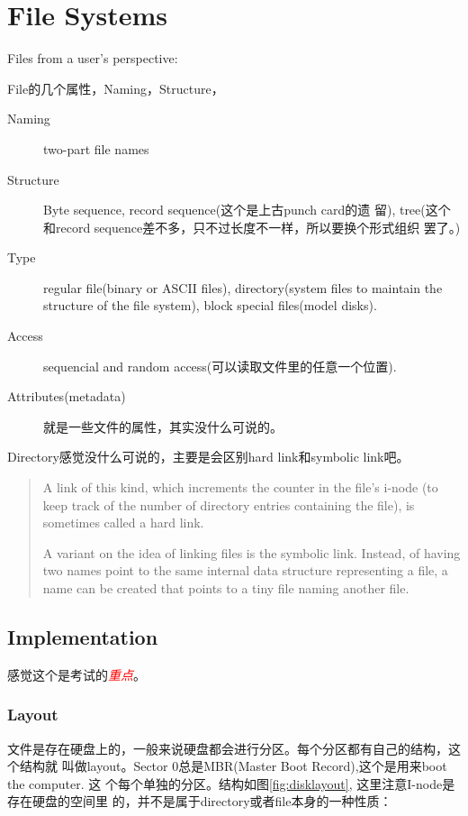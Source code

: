 \documentclass[a4paper]{article}
\newcommand{\emphasis}[1]{\textcolor{red}{\textit{#1}}}
\begin{document}
\section{File Systems}
Files from a user's perspective:

File的几个属性，Naming，Structure，
\begin{description}
\item[Naming]{two-part file names} 
\item[Structure]{Byte sequence, record sequence(这个是上古punch card的遗
    留), tree(这个和record sequence差不多，只不过长度不一样，所以要换个形式组织
    罢了。)} 
\item[Type]{regular file(binary or ASCII files), directory(system files to
    maintain the structure of the file system), block special files(model disks).} 
\item[Access]{sequencial and random access(可以读取文件里的任意一个位置).} 
\item[Attributes(metadata)]{就是一些文件的属性，其实没什么可说的。} 
\end{description}

Directory感觉没什么可说的，主要是会区别hard link和symbolic link吧。

\begin{quote}
  A link of this kind, which increments the counter in the file’s
i-node (to keep track of the number of directory entries containing the
file), is sometimes called a hard link.

  A variant on the idea of linking files is the symbolic link. Instead, of having
two names point to the same internal data structure representing a file, a name can
be created that points to a tiny file naming another file.
\end{quote}

\subsection{Implementation}
感觉这个是考试的\emphasis{重点}。

\subsubsection{Layout}
文件是存在硬盘上的，一般来说硬盘都会进行分区。每个分区都有自己的结构，这个结构就
叫做layout。Sector 0总是MBR(Master Boot Record),这个是用来boot the computer. 这
个每个单独的分区。结构如图\ref{fig:disklayout}, 这里注意I-node是存在硬盘的空间里
的，并不是属于directory或者file本身的一种性质：
\end{document}
